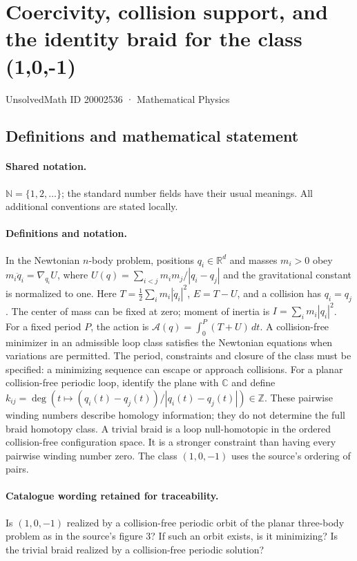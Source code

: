 \documentclass[11pt]{article}
\begin{document}
\setcounter{section}{20002535}
\section{Coercivity, collision support, and the identity braid for the class (1,0,-1)}\label{20002536}
{\small UnsolvedMath ID 20002536 · Mathematical Physics}
\subsection{Definitions and mathematical statement}

\paragraph{Shared notation.}$\mathbb N=\{1,2,\ldots\}$; the standard number fields have their usual meanings. All additional conventions are stated locally.


\paragraph{Definitions and notation.}In the Newtonian $n$-body problem, positions $q_i\in\mathbb R^d$ and masses $m_i>0$ obey $m_i\ddot q_i=\nabla_{q_i}U$, where $U(q)=\sum_{i<j}m_im_j/|q_i-q_j|$ and the gravitational constant is normalized to one. Here $T=\tfrac12\sum_i m_i|\dot q_i|^2$, $E=T-U$, and a collision has $q_i=q_j$. The center of mass can be fixed at zero; moment of inertia is $I=\sum_i m_i|q_i|^2$. For a fixed period $P$, the action is $\mathcal A(q)=\int_0^P(T+U)\,dt$. A collision-free minimizer in an admissible loop class satisfies the Newtonian equations when variations are permitted. The period, constraints and closure of the class must be specified: a minimizing sequence can escape or approach collisions. For a planar collision-free periodic loop, identify the plane with $\mathbb C$ and define $k_{ij}=\deg(t\mapsto(q_i(t)-q_j(t))/|q_i(t)-q_j(t)|)\in\mathbb Z$. These pairwise winding numbers describe homology information; they do not determine the full braid homotopy class. A trivial braid is a loop null-homotopic in the ordered collision-free configuration space. It is a stronger constraint than having every pairwise winding number zero. The class $(1,0,-1)$ uses the source’s ordering of pairs.

\paragraph{Catalogue wording retained for traceability.}
Is $(1,0,-1)$ realized by a collision-free periodic orbit of the planar three-body problem as in the source’s figure 3? If such an orbit exists, is it minimizing? Is the trivial braid realized by a collision-free periodic solution?
\end{document}
